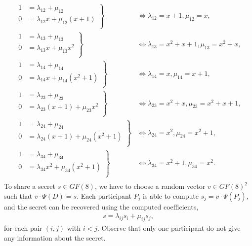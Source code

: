 \begin{equation*}
    \begin{split}
        \left.\begin{aligned}
        1 & = \lambda_{12} + \mu_{12}\\
        0 & = \lambda_{12} x + \mu_{12} (x+1)\\
        \end{aligned}\right\} & \iff \lambda_{12} = x + 1, \mu_{12} = x,\\
        \left.\begin{aligned}
        1 & = \lambda_{13} + \mu_{13}\\
        0 & = \lambda_{13} x + \mu_{13} x^2\\
        \end{aligned}\right\} & \iff \lambda_{13} = x^2+x+1,\mu_{13} = x^2+x,\\
        \left.\begin{aligned}
        1 & = \lambda_{14} + \mu_{14}\\
        0 & = \lambda_{14} x + \mu_{14} (x^2+1)\\
        \end{aligned}\right\} & \iff \lambda_{14} = x,\mu_{14} = x+1,\\
        \left.\begin{aligned}
        1 & = \lambda_{23} + \mu_{23}\\
        0 & = \lambda_{23} (x+1) + \mu_{23} x^2\\
        \end{aligned}\right\} & \iff \lambda_{23} = x^2+x,\mu_{23} = x^2+x+1,\\
        \left.\begin{aligned}
        1 & = \lambda_{24} + \mu_{24}\\
        0 & = \lambda_{24} (x+1) + \mu_{24} (x^2+1)\\
        \end{aligned}\right\} & \iff \lambda_{24} = x^2,\mu_{24} = x^2+1,\\
        \left.\begin{aligned}
        1 & = \lambda_{34} + \mu_{34}\\
        0 & = \lambda_{34} x^2 + \mu_{34} (x^2+1)\\
        \end{aligned}\right\} & \iff \lambda_{34} = x^2+1,\mu_{34} = x^2.\\
    \end{split}
\end{equation*}
To share a secret $s \in GF(8)$, we have to choose a random vector $v\in GF(8)^2$ such that $v\cdot\Psi(D) = s$.
Each participant $P_j$ is able to compute $s_j = v\cdot \Psi(P_j)$, and the secret can be recovered using the computed coefficients, 
\begin{equation*}
    \begin{split}
        s = \lambda_{ij}s_i + \mu_{ij}s_j,
    \end{split}
\end{equation*}
for each pair $(i,j)$ with $i<j$.
Observe that only one participant do not give any information about the secret.

